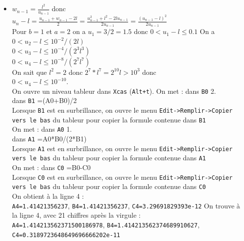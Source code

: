 \documentclass[a4paper,11pt]{book}
\newcommand{\N}{{\mathbb{N}}}
\begin{document}
\begin{itemize}
$\displaystyle u_{n+1}-w_{n+1}<u_{n+1}-w_n=\frac{u_n+w_n}{2}-w_n=\frac{u_n-w_n}{2}$\\
Donc $\displaystyle 0<u_n-w_n<\frac{u_0-w_0}{2^n}$\\
On a donc montr\'e que $u$ et $w$ sont adjacentes : elles convergent donc vers 
la m\^eme limite $l$ qui v\'erifie $0<b\leq l\leq a$ et $l^2=u_0w_0$ puisque 
pour tout $n\in \N$ $u_nw_n=u_0w_0$.\\
donc $l=\sqrt{u_0w_0}$
\item $\displaystyle w_{n-1}=\frac{l^2}{u_{n-1}}$ donc\\
$\displaystyle u_n-l=\frac{u_{n-1}+w_{n-1}-2l}{2}=\frac{u_{n-1}^2+l^2-2lu_{n-1}}{2u_{n-1}}=\frac{(u_{n-1}-l)^2}{2u_{n-1}}$\\
Pour $b=1$ et $a=2$ on a $u_1=3/2=1.5$  donc $0<u_1-l \leq 0.1$  
On a $0<u_2-l\leq 10^{-2}/(2l)$\\
$0<u_3-l\leq 10^{-4}/(2^3l^3)$\\
$0<u_4-l\leq 10^{-8}/(2^7l^7)$\\
On sait que $l^2=2$ donc $2^7*l^7=2^{10}l>10^3$ donc \\
$0<u_4-l\leq 10^{-10}$.\\
On ouvre un niveau tableur dans {\tt Xcas} ({\tt Alt+t}).
On met :
dans {\tt B0} 2.\\
dans {\tt B1} =(A0+B0)/2\\
Lorsque {\tt B1} est en surbrillance, on ouvre le menu 
{\tt Edit->Remplir->Copier vers le bas} du tableur pour copier la formule 
contenue dans {\tt B1}\\
On met :
dans {\tt A0} 1.\\
dans {\tt A1} =A0*B0/(2*B1)\\
Lorsque {\tt A1} est en surbrillance, on ouvre le menu 
{\tt Edit->Remplir->Copier vers le bas} du tableur  pour copier la formule 
contenue dans {\tt A1}\\
On met :
dans {\tt C0} =B0-C0\\
Lorsque  {\tt C0} est en surbrillance, on ouvre le menu
{\tt Edit->Remplir->Copier vers le bas} du tableur pour copier la formule 
contenue dans {\tt C0}\\
On obtient \`a la ligne 4 :\\
{\tt A4=1.41421356237}, {\tt B4=1.41421356237}, {\tt C4=3.29691829393e-12}
On trouve  \`a la ligne 4, avec 21 chiffres apr\`es la virgule :\\
{\tt A4=1.414213562371500186978}, {\tt B4=1.414213562374689910627}, \\
{\tt C4=0.3189723648649696666202e-11}\\

\end{itemize}
\end{document}
